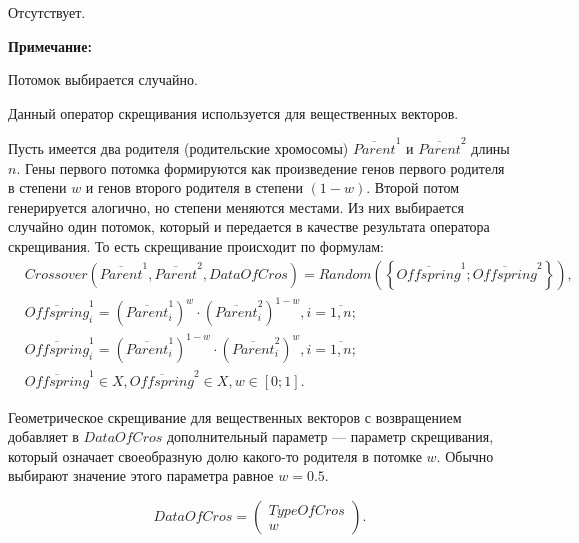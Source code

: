 \documentclass[a4paper,12pt]{article}
\begin{document}
 Отсутствует.
 
\textbf{ Примечание:}

 Потомок выбирается случайно.
 
Данный оператор скрещивания используется для вещественных векторов.

Пусть имеется два родителя (родительские хромосомы) $ \overline{Parent}^1 $ и $ \overline{Parent}^2$ длины $n$. Гены первого потомка формируются как произведение генов первого родителя в степени $w$ и генов второго родителя в степени $\left( 1-w\right) $. Второй потом генерируется алогично, но степени меняются местами.  Из них выбирается случайно один потомок, который и передается в качестве результата оператора скрещивания. То есть скрещивание происходит по формулам:
\begin{align}
\label{SetOfOperatorsAlgorithms:eq:GeometricalCrossoverForReal}
&Crossover \left( \overline{Parent}^1, \overline{Parent}^2, DataOfCros\right)=Random \left(\left\lbrace \overline{Offspring}^1; \overline{Offspring}^2\right\rbrace  \right), \\
& \overline{Offspring}^1_i=\left( \overline{Parent}^1_i\right)^w \cdot\left( \overline{Parent}^2_i\right)^{1-w}  , i=\overline{1,n};\nonumber\\
& \overline{Offspring}^1_i=\left( \overline{Parent}^1_i\right)^{1-w} \cdot\left( \overline{Parent}^2_i\right)^w  , i=\overline{1,n};\nonumber\\
&\overline{Offspring}^1\in X, \overline{Offspring}^2\in X, w\in \left[ 0; 1\right] .\nonumber
\end{align}

Геометрическое скрещивание для вещественных векторов с возвращением добавляет в $ DataOfCros $ дополнительный параметр --- параметр скрещивания, который означает своеобразную долю какого-то родителя в потомке $ w $. Обычно выбирают значение этого параметра равное $ w=0.5 $.

\begin{equation}
DataOfCros=\left( \begin{array}{c} TypeOfCros \\ w \end{array} \right).
\end{equation}
\end{document}
